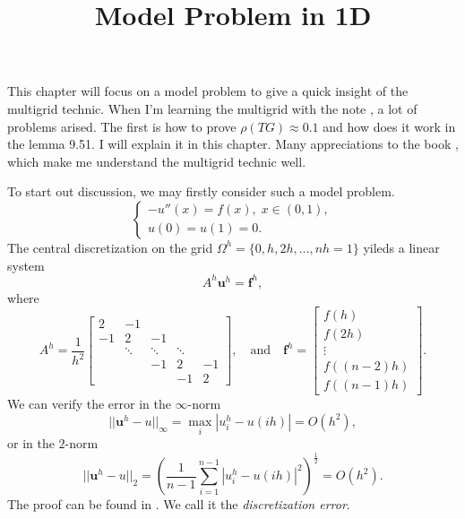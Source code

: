 \documentclass{SBCbookchapter}
\author{}
\title{Model Problem in 1D}
\newcounter{chapter}\setcounter{chapter}{1}
\begin{document}
\maketitle

This chapter will focus on a model problem to give a quick insight of the multigrid technic. When I'm learning the multigrid with the note \cite{zqhNA}, a lot of problems arised. The first is how to prove $\rho(TG)\approx 0.1$ and how does it work in the lemma 9.51. I will explain it in this chapter. Many appreciations to the book \cite{BriggsMultigrid}, which make me understand the multigrid technic well.

To start out discussion, we may firstly consider such a model problem.
\begin{equation}
	\left\{
		\begin{array}{l}
		-u''(x)=f(x),\;x\in(0,1),\\
		u(0)=u(1)=0.
		\end{array}
	\right.
\end{equation}
The central discretization on the grid $\Omega^h=\{0,h,2h,...,nh=1\}$ yileds a linear system
\begin{equation}
	A^h\mathbf{u}^h=\mathbf{f}^h,
\end{equation}
where
\begin{equation}
	A^h=\frac{1}{h^2}\begin{bmatrix}
		2 & -1\\
		-1 & 2 & -1\\
		   & \ddots & \ddots & \ddots \\
		   &        & -1 & 2 & -1\\
		   &        &    & -1 & 2
	\end{bmatrix}, 
	\quad \text{and} \quad
	\mathbf{f}^h=\begin{bmatrix}
		f(h)\\
		f(2h)\\
		\vdots\\
		f((n-2)h)\\
		f((n-1)h)
	\end{bmatrix}.
\end{equation}
We can verify the error in the $\infty$-norm
\begin{equation}
	||\mathbf{u}^h-u||_\infty=\max_{i}|u_i^h-u(ih)|=O(h^2),
\end{equation}
or in the $2$-norm
\begin{equation}
	||\mathbf{u}^h-u||_2=\left(\frac{1}{n-1}\sum_{i=1}^{n-1}|u_i^h-u(ih)|^2\right)^{\frac{1}{2}}=O(h^2).
\end{equation}
The proof can be found in \cite{LeVequeFDM}. We call it the \textit{discretization error}.
\end{document}
